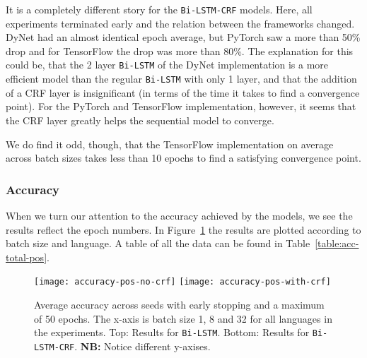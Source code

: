 It is a completely different story for the \texttt{Bi-LSTM-CRF} models. Here,
all experiments terminated early and the relation between the frameworks
changed.  DyNet had an almost identical epoch average, but PyTorch saw a more
than 50\% drop and for TensorFlow the drop was more than 80\%. The explanation
for this could be, that the 2 layer \texttt{Bi-LSTM} of the DyNet implementation
is a more efficient model than the regular \texttt{Bi-LSTM} with only 1 layer,
and that the addition of a CRF layer is insignificant (in terms of the time it
takes to find a convergence point). For the PyTorch and TensorFlow
implementation, however, it seems that the CRF layer greatly helps the
sequential model to converge.

We do find it odd, though, that the TensorFlow implementation on average across
batch sizes takes less than 10 epochs to find a satisfying convergence point.

\subsubsection*{Accuracy}

When we turn our attention to the accuracy achieved by the models, we see the
results reflect the epoch numbers. In
Figure~\ref{chart:acc-by-batch-and-lang-pos} the results are plotted
according to batch size and language. A table of all the data can be found in
Table~\ref{table:acc-total-pos}.

\begin{figure}[h!]
    \texttt{[image: accuracy-pos-no-crf]}
    \texttt{[image: accuracy-pos-with-crf]}
    \caption{Average accuracy across seeds with early stopping and a maximum of
        50 epochs. The x-axis is batch size 1, 8 and 32 for all languages in the
        experiments. Top: Results for \texttt{Bi-LSTM}. Bottom: Results for
    \texttt{Bi-LSTM-CRF}. \textbf{NB:} Notice different y-axises.
    }\label{chart:acc-by-batch-and-lang-pos}
\end{figure}

